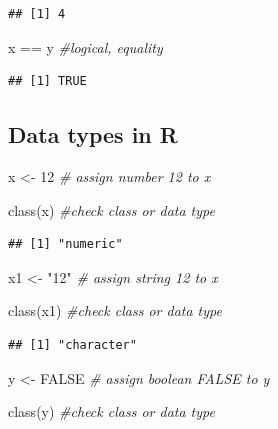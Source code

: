 \documentclass[
]{article}
\newenvironment{Shaded}{\begin{snugshade}}{\end{snugshade}}
\newcommand{\CommentTok}[1]{\textcolor[rgb]{0.56,0.35,0.01}{\textit{#1}}}
\newcommand{\ConstantTok}[1]{\textcolor[rgb]{0.00,0.00,0.00}{#1}}
\newcommand{\DecValTok}[1]{\textcolor[rgb]{0.00,0.00,0.81}{#1}}
\newcommand{\FunctionTok}[1]{\textcolor[rgb]{0.00,0.00,0.00}{#1}}
\newcommand{\NormalTok}[1]{#1}
\newcommand{\OtherTok}[1]{\textcolor[rgb]{0.56,0.35,0.01}{#1}}
\newcommand{\SpecialCharTok}[1]{\textcolor[rgb]{0.00,0.00,0.00}{#1}}
\newcommand{\StringTok}[1]{\textcolor[rgb]{0.31,0.60,0.02}{#1}}
\begin{document}
\begin{verbatim}
## [1] 4
\end{verbatim}

\begin{Shaded}
\begin{Highlighting}[]
\NormalTok{x }\SpecialCharTok{==}\NormalTok{ y }\CommentTok{\#logical, equality}
\end{Highlighting}
\end{Shaded}

\begin{verbatim}
## [1] TRUE
\end{verbatim}

\hypertarget{data-types-in-r}{%
\subsection{Data types in R}\label{data-types-in-r}}

\begin{Shaded}
\begin{Highlighting}[]
\NormalTok{x }\OtherTok{\textless{}{-}} \DecValTok{12} \CommentTok{\# assign number 12 to x}

\FunctionTok{class}\NormalTok{(x) }\CommentTok{\#check class or data type}
\end{Highlighting}
\end{Shaded}

\begin{verbatim}
## [1] "numeric"
\end{verbatim}

\begin{Shaded}
\begin{Highlighting}[]
\NormalTok{x1 }\OtherTok{\textless{}{-}} \StringTok{"12"} \CommentTok{\# assign string 12 to x}

\FunctionTok{class}\NormalTok{(x1) }\CommentTok{\#check class or data type}
\end{Highlighting}
\end{Shaded}

\begin{verbatim}
## [1] "character"
\end{verbatim}

\begin{Shaded}
\begin{Highlighting}[]
\NormalTok{y }\OtherTok{\textless{}{-}} \ConstantTok{FALSE} \CommentTok{\# assign boolean FALSE to y}

\FunctionTok{class}\NormalTok{(y) }\CommentTok{\#check class or data type}
\end{Highlighting}
\end{Shaded}
\end{document}
